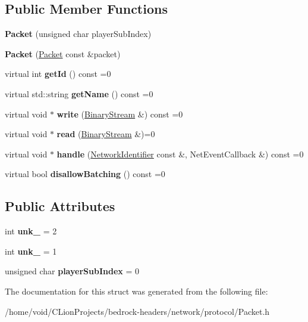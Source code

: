 \subsection*{Public Member Functions}
\begin{DoxyCompactItemize}
\item 
\mbox{\label{struct_packet_a8c995e4de5a50de3b31dcd7b7ee3fbfc}} 
{\bfseries Packet} (unsigned char player\+Sub\+Index)
\item 
\mbox{\label{struct_packet_a32b07be5461047eb99f5a22e309ea199}} 
{\bfseries Packet} (\mbox{\hyperlink{struct_packet}{Packet}} const \&packet)
\item 
\mbox{\label{struct_packet_a969163ec3c2e51ba7ac29443c231cffe}} 
virtual int {\bfseries get\+Id} () const =0
\item 
\mbox{\label{struct_packet_a3fea34a7be3439c92ad4e9c6903e698d}} 
virtual std\+::string {\bfseries get\+Name} () const =0
\item 
\mbox{\label{struct_packet_a225a02ece7602fe0e6d29986562b7f16}} 
virtual void $\ast$ {\bfseries write} (\mbox{\hyperlink{struct_binary_stream}{Binary\+Stream}} \&) const =0
\item 
\mbox{\label{struct_packet_a9828ac69f5405f539e8984c757249a5f}} 
virtual void $\ast$ {\bfseries read} (\mbox{\hyperlink{struct_binary_stream}{Binary\+Stream}} \&)=0
\item 
\mbox{\label{struct_packet_a23967beb8499270dc7e872b03d352e70}} 
virtual void $\ast$ {\bfseries handle} (\mbox{\hyperlink{struct_network_identifier}{Network\+Identifier}} const \&, Net\+Event\+Callback \&) const =0
\item 
\mbox{\label{struct_packet_a71ddc6e8c7f847f97de270165a19357f}} 
virtual bool {\bfseries disallow\+Batching} () const =0
\end{DoxyCompactItemize}
\subsection*{Public Attributes}
\begin{DoxyCompactItemize}
\item 
\mbox{\label{struct_packet_aeef1f1b66c04fa44914e136a22917296}} 
int {\bfseries unk\+\_} = 2
\item 
\mbox{\label{struct_packet_adb5fb0657e750fe89dab337c3a253b0c}} 
int {\bfseries unk\+\_} = 1
\item 
\mbox{\label{struct_packet_a2a7ab3c3fa701f0240f395a0ba6cae96}} 
unsigned char {\bfseries player\+Sub\+Index} = 0
\end{DoxyCompactItemize}


The documentation for this struct was generated from the following file\+:\begin{DoxyCompactItemize}
\item 
/home/void/\+C\+Lion\+Projects/bedrock-\/headers/network/protocol/Packet.\+h\end{DoxyCompactItemize}
